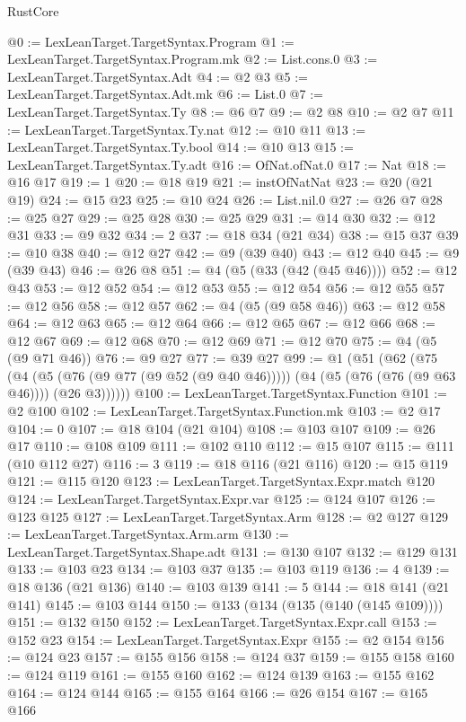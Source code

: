 \begin{lexlean}{RustCore}
\begin{coremodule}
@0 := LexLeanTarget.TargetSyntax.Program
@1 := LexLeanTarget.TargetSyntax.Program.mk
@2 := List.cons.{0}
@3 := LexLeanTarget.TargetSyntax.Adt
@4 := @2 @3
@5 := LexLeanTarget.TargetSyntax.Adt.mk
@6 := List.{0}
@7 := LexLeanTarget.TargetSyntax.Ty
@8 := @6 @7
@9 := @2 @8
@10 := @2 @7
@11 := LexLeanTarget.TargetSyntax.Ty.nat
@12 := @10 @11
@13 := LexLeanTarget.TargetSyntax.Ty.bool
@14 := @10 @13
@15 := LexLeanTarget.TargetSyntax.Ty.adt
@16 := OfNat.ofNat.{0}
@17 := Nat
@18 := @16 @17
@19 := 1
@20 := @18 @19
@21 := instOfNatNat
@23 := @20 (@21 @19)
@24 := @15 @23
@25 := @10 @24
@26 := List.nil.{0}
@27 := @26 @7
@28 := @25 @27
@29 := @25 @28
@30 := @25 @29
@31 := @14 @30
@32 := @12 @31
@33 := @9 @32
@34 := 2
@37 := @18 @34 (@21 @34)
@38 := @15 @37
@39 := @10 @38
@40 := @12 @27
@42 := @9 (@39 @40)
@43 := @12 @40
@45 := @9 (@39 @43)
@46 := @26 @8
@51 := @4 (@5 (@33 (@42 (@45 @46))))
@52 := @12 @43
@53 := @12 @52
@54 := @12 @53
@55 := @12 @54
@56 := @12 @55
@57 := @12 @56
@58 := @12 @57
@62 := @4 (@5 (@9 @58 @46))
@63 := @12 @58
@64 := @12 @63
@65 := @12 @64
@66 := @12 @65
@67 := @12 @66
@68 := @12 @67
@69 := @12 @68
@70 := @12 @69
@71 := @12 @70
@75 := @4 (@5 (@9 @71 @46))
@76 := @9 @27
@77 := @39 @27
@99 := @1
    (@51
      (@62
        (@75
          (@4
            (@5 (@76 (@9 @77 (@9 @52 (@9 @40 @46)))))
            (@4 (@5 (@76 (@76 (@9 @63 @46)))) (@26 @3))))))
@100 := LexLeanTarget.TargetSyntax.Function
@101 := @2 @100
@102 := LexLeanTarget.TargetSyntax.Function.mk
@103 := @2 @17
@104 := 0
@107 := @18 @104 (@21 @104)
@108 := @103 @107
@109 := @26 @17
@110 := @108 @109
@111 := @102 @110
@112 := @15 @107
@115 := @111 (@10 @112 @27)
@116 := 3
@119 := @18 @116 (@21 @116)
@120 := @15 @119
@121 := @115 @120
@123 := LexLeanTarget.TargetSyntax.Expr.match @120
@124 := LexLeanTarget.TargetSyntax.Expr.var
@125 := @124 @107
@126 := @123 @125
@127 := LexLeanTarget.TargetSyntax.Arm
@128 := @2 @127
@129 := LexLeanTarget.TargetSyntax.Arm.arm
@130 := LexLeanTarget.TargetSyntax.Shape.adt
@131 := @130 @107
@132 := @129 @131
@133 := @103 @23
@134 := @103 @37
@135 := @103 @119
@136 := 4
@139 := @18 @136 (@21 @136)
@140 := @103 @139
@141 := 5
@144 := @18 @141 (@21 @141)
@145 := @103 @144
@150 := @133 (@134 (@135 (@140 (@145 @109))))
@151 := @132 @150
@152 := LexLeanTarget.TargetSyntax.Expr.call
@153 := @152 @23
@154 := LexLeanTarget.TargetSyntax.Expr
@155 := @2 @154
@156 := @124 @23
@157 := @155 @156
@158 := @124 @37
@159 := @155 @158
@160 := @124 @119
@161 := @155 @160
@162 := @124 @139
@163 := @155 @162
@164 := @124 @144
@165 := @155 @164
@166 := @26 @154
@167 := @165 @166

\end{coremodule}
\end{lexlean}
